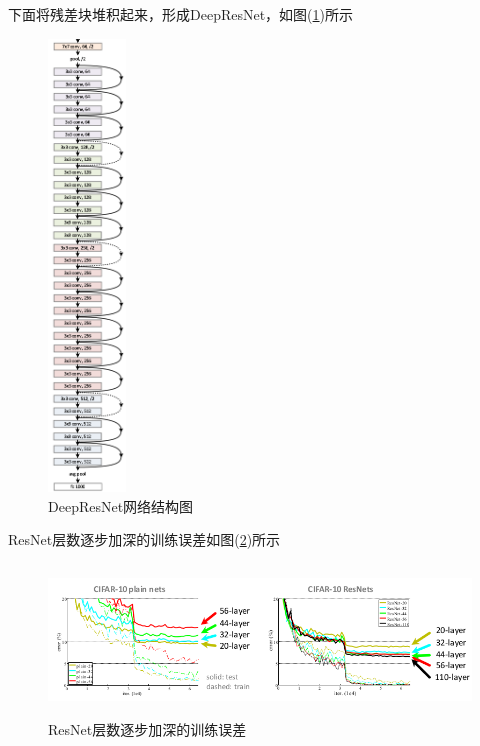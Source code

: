             \par
            下面将残差块堆积起来，形成DeepResNet，如图(\ref{fig:DeepResNet网络结构图})所示
            \begin{figure}[H]
            \centering
            \includegraphics[height=12cm,angle=90]{images/DeepResNet_sructure.jpg}
            \caption{DeepResNet网络结构图}
            \label{fig:DeepResNet网络结构图}
            \end{figure}
            \par
            ResNet层数逐步加深的训练误差如图(\ref{fig:ResNet层数逐步加深的训练误差})所示
            \begin{figure}[H]
            \centering
            \includegraphics[height=4cm]{images/trainingerror_of_The_number_of_ResNetlayers_gradually_deepen.jpg}
            \caption{ResNet层数逐步加深的训练误差}
            \label{fig:ResNet层数逐步加深的训练误差}
            \end{figure}
